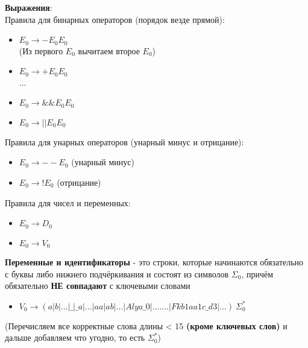 \documentclass[12pt]{article}
\begin{document}
		
\vspace{\baselineskip}
 
 
 \textbf{Выражения}: \\
 Правила для бинарных операторов (порядок везде прямой): \\
 \begin{itemize}
	\item $E_0 \to - $\textvisiblespace$ E_0 $\textvisiblespace$ E_0 $ \\
	(Из первого $E_0$ вычитаем второе $E_0$) 
	\item $E_0 \to + $\textvisiblespace$ E_0 $\textvisiblespace$ E_0 $ \\
	...
	\item $E_0 \to \&\& $\textvisiblespace$ E_0 $\textvisiblespace$ E_0 $
	\item $E_0 \to || $\textvisiblespace$ E_0 $\textvisiblespace$ E_0 $

\end{itemize}
  
  Правила для унарных операторов (унарный минус и отрицание): \\
  
  \begin{itemize}
 	\item $E_0 \to  - -  $\textvisiblespace$ E_0$ (унарный минус)
 	\item $E_0 \to  !  $\textvisiblespace$ E_0$ (отрицание)
 \end{itemize}
   
   Правила для чисел и переменных: \\
  
  \begin{itemize}
	\item $E_0 \to D_0$
	\item $E_0 \to V_0$
\end{itemize}

\vspace{\baselineskip}
\vspace{\baselineskip}

 \textbf{Переменные и идентификаторы} - это строки, которые начинаются обязательно с буквы либо нижнего подчёркивания и состоят из символов $\Sigma_0$, причём обязательно \textbf{НЕ совпадают} с ключевыми словами  \\
\begin{itemize}
	\item $V_0 \to (a | b | ... |\_ |\_a| ... |aa|ab|...|Alya\_0| .......|Fkb1aa1c\_d3|...)\ \Sigma_0^*$
\end{itemize}
(Перечисляем все корректные слова длины < 15 \textbf{(кроме ключевых слов)} и дальше добавляем что угодно, то есть $\Sigma_0^*$) \\
\end{document}
